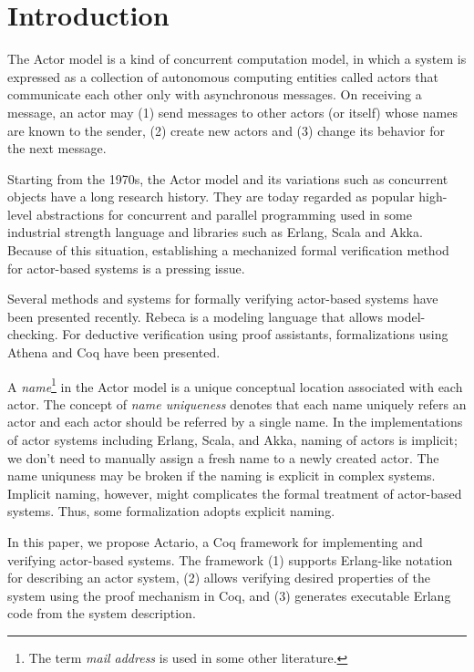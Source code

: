 \section{Introduction}
\label{sec:introduction}


The Actor model\cite{Agha:1986aa} is a kind of concurrent computation
model, in which a system is expressed as a collection of autonomous
computing entities called actors that communicate each other only with
asynchronous messages.
On receiving a message, an actor may (1)
send messages to other actors (or itself) whose names are known to the
sender, (2) create new actors and (3) change its behavior for the next
message.

Starting from the 1970s, the Actor model and its variations such as
concurrent objects\cite{Yonezawa:1986aa} have a long research
history. They are today regarded as popular high-level abstractions
for concurrent and parallel programming used in some industrial
strength language and libraries such as Erlang\cite{Erlang},
Scala\cite{Scala} and Akka\cite{Akka}.  Because of this situation,
establishing a mechanized formal verification method for actor-based
systems is a pressing issue.

Several methods and systems for formally verifying actor-based systems
have been presented recently. Rebeca\cite{Sirjani:2011aa} is a
modeling language that allows model-checking.  For deductive
verification using proof assistants, formalizations using
Athena\cite{Musser:2013aa} and Coq\cite{Garnock-Jones:2014aa} have
been presented.

A \emph{name}\footnote{The term \emph{mail address} is used in some other
  literature.} in the Actor model is a unique conceptual location
associated with each actor.  The concept of \emph{name uniqueness}
denotes that each name uniquely refers an actor and each actor should
be referred by a single name.  In the implementations of actor systems
including Erlang, Scala, and Akka, naming of actors is implicit; we
don't need to manually assign a fresh name to a newly created actor.
The name uniquness may be broken if the naming is explicit in complex
systems.  Implicit naming, however, might complicates the formal
treatment of actor-based systems. Thus, some formalization adopts
explicit naming.


In this paper, we propose Actario\cite{Actario}, a Coq framework for
implementing and verifying actor-based systems.  The framework (1)
supports Erlang-like notation for describing an actor system, (2)
allows verifying desired properties of the system using the proof
mechanism in Coq, and (3) generates executable Erlang code from the
system description.

